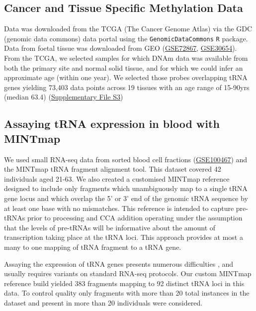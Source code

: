 \documentclass[
]{book}
\begin{document}
\hypertarget{TCGAmethods}{%
\subsection{Cancer and Tissue Specific Methylation Data}\label{TCGAmethods}}

Data was downloaded from the TCGA (The Cancer Genome Atlas) via the GDC (genomic data commons) data portal \citep{Grossman2016} using the \texttt{GenomicDataCommons} \texttt{R} package.
Data from foetal tissue \citep{Yang2016, Nazor2012} was downloaded from GEO (\href{https://www.ncbi.nlm.nih.gov/geo/query/acc.cgi?acc=GSE72867}{GSE72867}, \href{https://www.ncbi.nlm.nih.gov/geo/query/acc.cgi?acc=GSE30654}{GSE30654}).
From the TCGA, we selected samples for which DNAm data was available from both the primary site and normal solid tissue, and for which we could infer an approximate age (within one year).
We selected those probes overlapping tRNA genes yielding 73,403 data points across 19 tissues with an age range of 15-90yrs (median 63.4) (\href{./Supplementary_Files/TCGA_samples_used.tsv}{Supplementary File S3})

\hypertarget{mintmapmethods}{%
\subsection{Assaying tRNA expression in blood with MINTmap}\label{mintmapmethods}}

We used small RNA-seq data from sorted blood cell fractions \citep{Juzenas2017} (\href{https://www.ncbi.nlm.nih.gov/geo/query/acc.cgi?acc=GSE100467}{GSE100467}) and the MINTmap \citep{Loher2017} tRNA fragment alignment tool.
This dataset covered 42 individuals aged 21-63.
We also created a customised MINTmap reference designed to include only fragments which unambiguously map to a single tRNA gene locus and which overlap the 5' or 3' end of the genomic tRNA sequence by at least one base with no mismatches.
This reference is intended to capture pre-tRNAs prior to processing and CCA addition operating under the assumption that the levels of pre-tRNAs will be informative about the amount of transcription taking place at the tRNA loci.
This approach provides at most a many to one mapping of tRNA fragment to a tRNA gene.

Assaying the expression of tRNA genes presents numerous difficulties \citep{Torres2019}, and usually requires variants on standard RNA-seq protocols.
Our custom MINTmap reference build yielded 383 fragments mapping to 92 distinct tRNA loci in this data.
To control quality only fragments with more than 20 total instances in the dataset and present in more than 20 individuals were considered.
\end{document}
